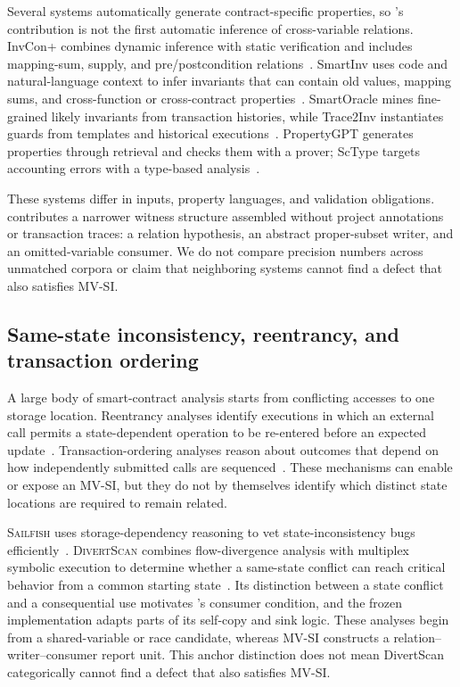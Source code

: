 Several systems automatically generate contract-specific properties, so \tool's contribution is not the first automatic inference of cross-variable relations. InvCon+ combines dynamic inference with static verification and includes mapping-sum, supply, and pre/postcondition relations~\cite{invconplus2025}. SmartInv uses code and natural-language context to infer invariants that can contain old values, mapping sums, and cross-function or cross-contract properties~\cite{smartinv2024}. SmartOracle mines fine-grained likely invariants from transaction histories, while Trace2Inv instantiates guards from templates and historical executions~\cite{smartoracle2025,trace2inv2024}. PropertyGPT generates properties through retrieval and checks them with a prover; ScType targets accounting errors with a type-based analysis~\cite{propertygpt2025,sctype2024}.

These systems differ in inputs, property languages, and validation obligations. \tool contributes a narrower witness structure assembled without project annotations or transaction traces: a relation hypothesis, an abstract proper-subset writer, and an omitted-variable consumer. We do not compare precision numbers across unmatched corpora or claim that neighboring systems cannot find a defect that also satisfies MV-SI.

\subsection{Same-state inconsistency, reentrancy, and transaction ordering}
\label{s:related-si}

A large body of smart-contract analysis starts from conflicting accesses to one storage location. Reentrancy analyses identify executions in which an external call permits a state-dependent operation to be re-entered before an expected update~\cite{luu2016making,rodler2018sereum,xue2020cross,brent2020ethainter,cecchetti2021compositional}. Transaction-ordering analyses reason about outcomes that depend on how independently submitted calls are sequenced~\cite{kolluri2019exploiting,wang2019detecting,munir2023todler,ma2023transracer,zhang2023combatting}. These mechanisms can enable or expose an MV-SI, but they do not by themselves identify which distinct state locations are required to remain related.

\textsc{Sailfish} uses storage-dependency reasoning to vet state-inconsistency bugs efficiently~\cite{bose2022sailfish}. \textsc{DivertScan} combines flow-divergence analysis with multiplex symbolic execution to determine whether a same-state conflict can reach critical behavior from a common starting state~\cite{liu2025detecting}. Its distinction between a state conflict and a consequential use motivates \sys{}'s consumer condition, and the frozen implementation adapts parts of its self-copy and sink logic. These analyses begin from a shared-variable or race candidate, whereas MV-SI constructs a relation--writer--consumer report unit. This anchor distinction does not mean DivertScan categorically cannot find a defect that also satisfies MV-SI.

